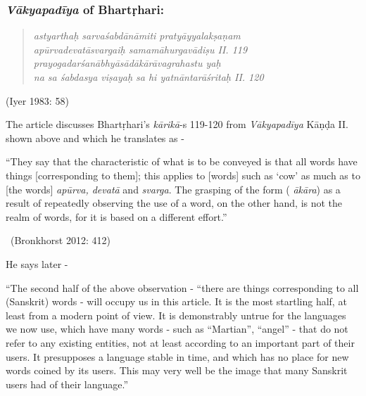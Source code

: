 \vspace{-0.25cm}

\subsubsection*{\textit{Vākyapadīya} of Bhartṛhari:}

\begin{verse}
\textit{astyarthaḥ sarvaśabdānāmiti pratyāyyalakṣaṇam }\\
\textit{apūrvadevatāsvargaiḥ samamāhurgavādiṣu  II. 119}\\
\textit{prayogadarśanābhyāsādākārāvagrahastu yaḥ }\\
\textit{na sa śabdasya viṣayaḥ sa hi yatnāntarāśritaḥ  II. 120}
\end{verse}

\vspace{-0.55cm}

\begin{flushright}
 (Iyer 1983: 58)
\end{flushright}


The article discusses Bhartṛhari’s \textit{kārikā}-s 119-120 from \textit{Vākyapadīya} Kāṇḍa II. shown above and which he translates as -

\begin{myquote}
“They say that the characteristic of what is to be conveyed is that all words have things [corresponding to them]; this applies to [words] such as ‘cow’ as much as to [the words] \textit{apūrva, devatā} and \textit{svarga}. The grasping of the form (\textit{ ākāra}) as a result of repeatedly observing the use of a word, on the other hand, is not the realm of words, for it is based on a different effort.” 
\end{myquote}

\vspace{-.3cm}

\begin{myquote}

~\hfill (Bronkhorst 2012: 412)
\end{myquote}

He says later -

\begin{myquote}
“The second half of the above observation - “there are things corresponding to all (Sanskrit) words - will occupy us in this article. It is the most startling half, at least from a modern point of view. It is demonstrably untrue for the languages we now use, which have many words - such as “Martian”, “angel” - that do not refer to any existing entities, not at least according to an important part of their users. It presupposes a language stable in time, and which has no place for new words coined by its users. This may very well be the image that many Sanskrit users had of their language.”
\end{myquote}

